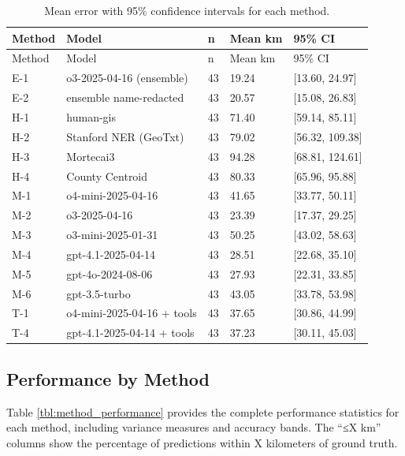 \begin{longtable}[]{@{}lllll@{}}
\caption{\label{tbl:error_ci}Mean error with 95\% confidence intervals
for each method.}\tabularnewline
\toprule\noalign{}
Method & Model & n & Mean km & 95\% CI \\
\midrule\noalign{}
\endfirsthead
\toprule\noalign{}
Method & Model & n & Mean km & 95\% CI \\
\midrule\noalign{}
\endhead
\bottomrule\noalign{}
\endlastfoot
E-1 & o3-2025-04-16 (ensemble) & 43 & 19.24 & {[}13.60, 24.97{]} \\
E-2 & ensemble name-redacted & 43 & 20.57 & {[}15.08, 26.83{]} \\
H-1 & human-gis & 43 & 71.40 & {[}59.14, 85.11{]} \\
H-2 & Stanford NER (GeoTxt) & 43 & 79.02 & {[}56.32, 109.38{]} \\
H-3 & Mortecai3 & 43 & 94.28 & {[}68.81, 124.61{]} \\
H-4 & County Centroid & 43 & 80.33 & {[}65.96, 95.88{]} \\
M-1 & o4-mini-2025-04-16 & 43 & 41.65 & {[}33.77, 50.11{]} \\
M-2 & o3-2025-04-16 & 43 & 23.39 & {[}17.37, 29.25{]} \\
M-3 & o3-mini-2025-01-31 & 43 & 50.25 & {[}43.02, 58.63{]} \\
M-4 & gpt-4.1-2025-04-14 & 43 & 28.51 & {[}22.68, 35.10{]} \\
M-5 & gpt-4o-2024-08-06 & 43 & 27.93 & {[}22.31, 33.85{]} \\
M-6 & gpt-3.5-turbo & 43 & 43.05 & {[}33.78, 53.98{]} \\
T-1 & o4-mini-2025-04-16 + tools & 43 & 37.65 & {[}30.86, 44.99{]} \\
T-4 & gpt-4.1-2025-04-14 + tools & 43 & 37.23 & {[}30.11, 45.03{]} \\
\end{longtable}

\subsection{Performance by
Method}\label{b.2-performance-by-method}

Table \ref{tbl:method_performance} provides the complete performance
statistics for each method, including variance measures and accuracy
bands. The ``≤X km'' columns show the percentage of predictions within X
kilometers of ground truth.

